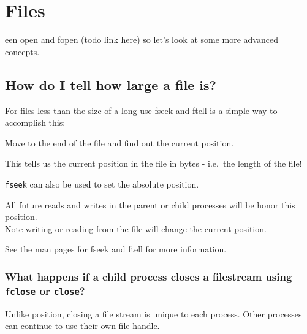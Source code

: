 \chapter{Files}een
\href{http://angrave.github.io/sysassets/web/chapter1.html}{open} and
fopen (todo link here) so let's look at some more advanced concepts.

\section{How do I tell how large a file
is?}\label{how-do-i-tell-how-large-a-file-is}

For files less than the size of a long use fseek and ftell is a simple
way to accomplish this:

Move to the end of the file and find out the current position.

\begin{Shaded}
\begin{Highlighting}[]
 
\end{Highlighting}
\end{Shaded}

This tells us the current position in the file in bytes - i.e.~the
length of the file!

\texttt{fseek} can also be used to set the absolute position.

\begin{Shaded}
\begin{Highlighting}[]
\end{Highlighting}
\end{Shaded}

All future reads and writes in the parent or child processes will be
honor this position.\\Note writing or reading from the file will change
the current position.

See the man pages for fseek and ftell for more information.

\subsection{\texorpdfstring{What happens if a child process closes a
filestream using \texttt{fclose} or
\texttt{close}?}{What happens if a child process closes a filestream using fclose or close?}}\label{what-happens-if-a-child-process-closes-a-filestream-using-fclose-or-close}

Unlike position, closing a file stream is unique to each process. Other
processes can continue to use their own file-handle.
